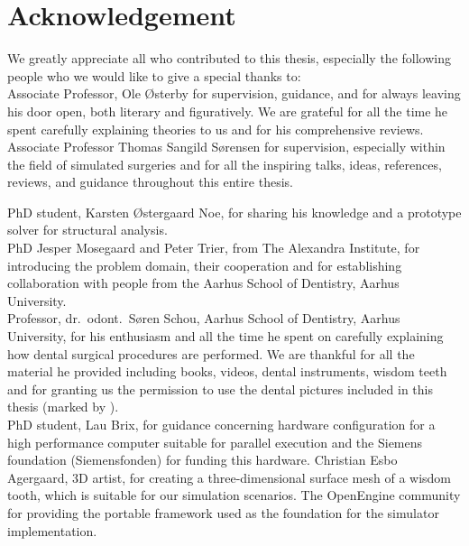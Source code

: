 
\chapter*{Acknowledgement}
We greatly appreciate all who contributed to this thesis,
especially the following people who we would like to give a special
thanks to: \\ 

Associate Professor, Ole Østerby for supervision, guidance, and
for always leaving his door open, both literary and figuratively. We
are grateful for all the time he spent carefully explaining theories
to us and for his comprehensive reviews. 
%
Associate Professor Thomas Sangild Sørensen for supervision, especially within the field
of simulated surgeries and for all the inspiring talks, ideas,
references, reviews, and guidance throughout this entire thesis.

%
PhD student, Karsten Østergaard Noe, for sharing his knowledge and
a prototype solver for structural analysis. \\

PhD Jesper Mosegaard and Peter Trier, from The Alexandra
Institute, for introducing the problem domain, their cooperation and
for establishing collaboration with people from the Aarhus School of
Dentistry, Aarhus University. \\

Professor, dr.~odont.~Søren Schou, Aarhus School of Dentistry, Aarhus
University, for his enthusiasm and all the time he spent on carefully
explaining how dental surgical procedures are performed. We are
thankful for all the material he provided including books, videos,
dental instruments, wisdom teeth and for granting us the permission to
use the dental pictures included in this thesis (marked by \textdagger). \\

PhD student, Lau Brix, for guidance concerning hardware
configuration for a high performance computer suitable for parallel
execution
%
and the Siemens foundation (Siemensfonden) for funding this
hardware.
%
Christian Esbo Agergaard, 3D artist, for creating a three-dimensional
surface mesh of a wisdom tooth, which is suitable for our simulation
scenarios.
%
The OpenEngine community for providing the portable framework used as
the foundation for the simulator implementation.
